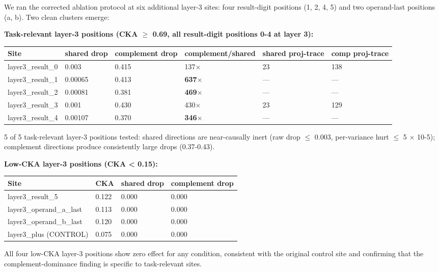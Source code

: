 We ran the corrected ablation protocol at six additional layer-3 sites:
four result-digit positions (1, 2, 4, 5) and two operand-last positions
(a, b). Two clean clusters emerge:

\textbf{Task-relevant layer-3 positions (CKA $\geq$ 0.69, all result-digit positions 0-4 at layer 3):}

\begin{center}
\begin{tabular}{|l|l|l|l|l|l|}
\hline
\textbf{Site} & \textbf{shared drop} & \textbf{complement drop} & \textbf{complement/shared} & \textbf{shared proj-trace} & \textbf{comp proj-trace} \\
\hline
layer3\_result\_0 & 0.003 & 0.415 & 137$\times$ & 23 & 138 \\
layer3\_result\_1 & 0.00065 & 0.413 & \textbf{637$\times$} & --- & --- \\
layer3\_result\_2 & 0.00081 & 0.381 & \textbf{469$\times$} & --- & --- \\
layer3\_result\_3 & 0.001 & 0.430 & 430$\times$ & 23 & 129 \\
layer3\_result\_4 & 0.00107 & 0.370 & \textbf{346$\times$} & --- & --- \\
\hline
\end{tabular}
\end{center}


5 of 5 task-relevant layer-3 positions tested: shared directions are
near-causally inert (raw drop $\leq$ 0.003, per-variance hurt $\leq$ 5 $\times$ 10-5);
complement directions produce consistently large drops (0.37-0.43).

\textbf{Low-CKA layer-3 positions (CKA < 0.15):}

\begin{center}
\begin{tabular}{|l|l|l|l|}
\hline
\textbf{Site} & \textbf{CKA} & \textbf{shared drop} & \textbf{complement drop} \\
\hline
layer3\_result\_5 & 0.122 & 0.000 & 0.000 \\
layer3\_operand\_a\_last & 0.113 & 0.000 & 0.000 \\
layer3\_operand\_b\_last & 0.120 & 0.000 & 0.000 \\
layer3\_plus (CONTROL) & 0.075 & 0.000 & 0.000 \\
\hline
\end{tabular}
\end{center}


All four low-CKA layer-3 positions show zero effect for any condition,
consistent with the original control site and confirming that the
complement-dominance finding is specific to task-relevant sites.

